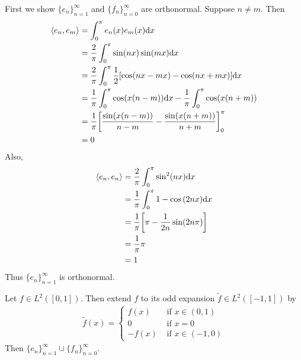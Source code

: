 \documentclass[12pt]{article}
\theoremstyle{plain}
\begin{document}
First we show $\{e_n\}_{n=1}^\infty$ and $\{f_n\}_{n=0}^\infty$ are orthonormal.  Suppose $n \neq m$.  Then
\begin{align*}
    \langle e_n, e_m \rangle &= \int_0^\pi e_n(x)e_m(x) \dd x \\
    &= \frac{2}{\pi}\int_0^\pi \sin(nx) \sin (mx) \dd x\\
    &= \frac{2}{\pi}\int_0^\pi \frac{1}{2}\qty[\cos(nx - mx) - \cos(nx + mx)]\dd x \\
    &= \frac{1}{\pi}\int_0^\pi\cos(x(n-m))\dd x - \frac{1}{\pi}\int_0^\pi\cos(x(n+m)) \\
    &= \frac{1}{\pi}\qty[\frac{\sin(x(n-m))}{n-m} - \frac{\sin(x(n+m))}{n+m}]_0^\pi \\
    &= 0
\end{align*}
Also,
\begin{align*}
    \langle e_n, e_n \rangle &= \frac{2}{\pi}\int_0^\pi \sin^2(nx)\dd x \\
    &= \frac{1}{\pi} \int_0^\pi 1 - \cos\qty(2nx) \dd x \\
    &= \frac{1}{\pi} \qty[\pi - \frac{1}{2n}\sin(2n\pi)] \\
    &= \frac{1}{\pi}\pi\\ 
    &= 1
\end{align*}
Thus $\{e_n\}_{n=1}^\infty$ is orthonormal.

Let $f \in L^2([0, 1])$.  Then extend $f$ to its odd expansion $\tilde{f} \in L^2([-1, 1])$ by
\begin{align*}
    \tilde{f}(x) = \begin{cases}
        f(x) & \text{ if } x \in (0, 1) \\
        0 & \text{ if } x = 0 \\
        -f(x) & \text{ if } x \in (-1, 0)
    \end{cases}
\end{align*}
Then $\{e_n\}_{n=1}^\infty \cup \{f_n\}_{n=0}^\infty$.
\end{document}
